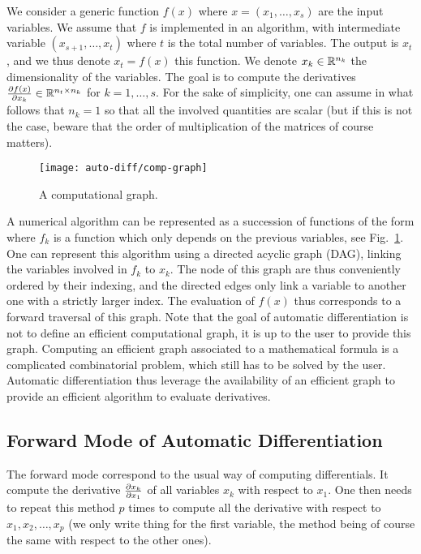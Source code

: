 We consider a generic function $f(x)$ where $x=(x_1,\ldots,x_s)$ are the input variables. We assume that $f$ is implemented in an algorithm, with intermediate variable $(x_{s+1},\ldots,x_t)$ where $t$ is the total number of variables. The output is $x_t$, and we thus denote $x_t=f(x)$ this function. We denote $x_k \in \mathbb{R}^{n_k}$ the dimensionality of the variables. The goal is to compute the derivatives $\frac{ \partial f(x)}{\partial x_k} \in \mathbb{R}^{n_t \times n_k}$ for $k=1,\ldots,s$. For the sake of simplicity, one can assume in what follows that $n_k=1$ so that all the involved quantities are scalar (but if this is not the case, beware that the order of multiplication of the matrices of course matters).

\begin{figure}
\centering
\texttt{[image: auto-diff/comp-graph]}
\caption{\label{fig-compgraph}
A computational graph.
}
\end{figure}

A numerical algorithm can be represented as a succession of functions of the form
where $f_k$ is a function which only depends on the previous variables, see Fig.~\ref{fig-compgraph}. One can represent this algorithm using a directed acyclic graph (DAG), linking the variables involved in $f_k$ to $x_k$. The node of this graph are thus conveniently ordered by their indexing, and the directed edges only link a variable to another one with a strictly larger index.
%
The evaluation of $f(x)$ thus corresponds to a forward traversal of this graph. 
% 
Note that the goal of automatic differentiation is not to define an efficient computational graph, it is up to the user to provide this graph. Computing an efficient graph associated to a mathematical formula is a complicated combinatorial problem, which still has to be solved by the user. Automatic differentiation thus leverage the availability of an efficient graph to provide an efficient algorithm to evaluate derivatives. 



\subsection{Forward Mode of Automatic Differentiation}

The forward mode correspond to the usual way of computing differentials. It compute the derivative $\frac{ \partial x_k}{\partial x_1}$ of all variables $x_k$ with respect to $x_1$. One then needs to repeat this method $p$ times to compute all the derivative with respect to $x_1,x_2,\ldots,x_p$ (we only write thing for the first variable, the method being of course the same with respect to the other ones).

